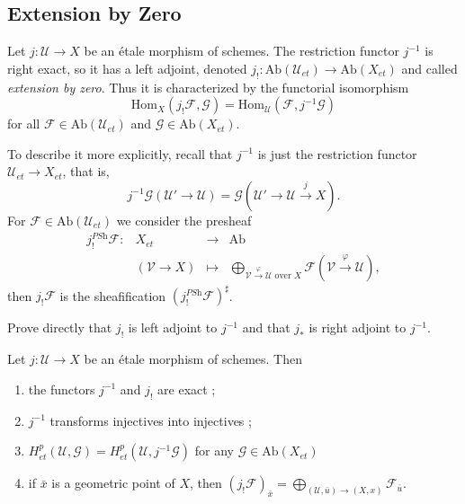 \subsection{Extension by Zero}

\begin{definition}
Let $j: \mathcal{U} \to X$ be an \'etale morphism of schemes. The restriction functor $j^{-1}$ is right exact, so it has a left adjoint, denoted $j_! : \text{Ab}(\mathcal{U}_{et})\to \text{Ab}(X_{et})$ and called \emph{extension by zero}. Thus it is characterized by the functorial isomorphism
$$\text{Hom}_X(j_!\mathcal{F}, \mathcal{G}) = \text{Hom}_\mathcal{U}(\mathcal{F}, j^{-1}\mathcal{G})$$
for all $\mathcal{F} \in \text{Ab}(\mathcal{U}_{et})$ and $\mathcal{G} \in \text{Ab}(X_{et})$.
\end{definition}

To describe it more explicitly, recall that $j^{-1}$ is just the restriction functor $\mathcal{U}_{et}\to X_{et}$, that is, 
$$
j^{-1}\mathcal{G}(\mathcal{U}'\to \mathcal{U}) = \mathcal{G} \left(\mathcal{U}'\to \mathcal{U} \xrightarrow{j} X\right).$$
For $\mathcal{F} \in \text{Ab}(\mathcal{U}_{et})$ we consider the presheaf
$$
\begin{array}{rrcl}
j_!^{\textit{PSh}}\mathcal{F}: & X_{et} &\longrightarrow & \text{Ab}\\
& (\mathcal{V}\to X) & \longmapsto & \displaystyle \bigoplus_{\mathcal{V}\xrightarrow{\varphi} \mathcal{U}\text{ over }X} \mathcal{F}(\mathcal{V}\xrightarrow{\varphi}\mathcal{U}),
\end{array}
$$
then $j_!\mathcal{F}$ is the sheafification $\left(j_!^{\textit{PSh}}\mathcal{F}\right)^\sharp$.

\begin{exercise}
Prove directly that $j_!$ is left adjoint to $j^{-1}$ and that $j_*$ is right adjoint to $j^{-1}$.
\end{exercise}

\begin{proposition}
Let $j : \mathcal{U} \to X$ be an \'etale morphism of schemes. Then
\begin{enumerate}
\item the functors $j^{-1}$ and $j_!$ are exact ;
\item $j^{-1}$ transforms injectives into injectives ;
\item $H_{et}^p(\mathcal{U}, \mathcal{G})= H_{et}^p(\mathcal{U}, j^{-1}\mathcal{G})$ for any $\mathcal{G} \in \text{Ab}(X_{et})$
\item if $\bar x$ is a geometric point of $X$, then $\left(j_!\mathcal{F}\right)_{\bar x} =\displaystyle \bigoplus_{(\mathcal{U}, \bar u) \to (X, x)} \mathcal{F}_{\bar{u}}$.
\end{enumerate}
\end{proposition}

